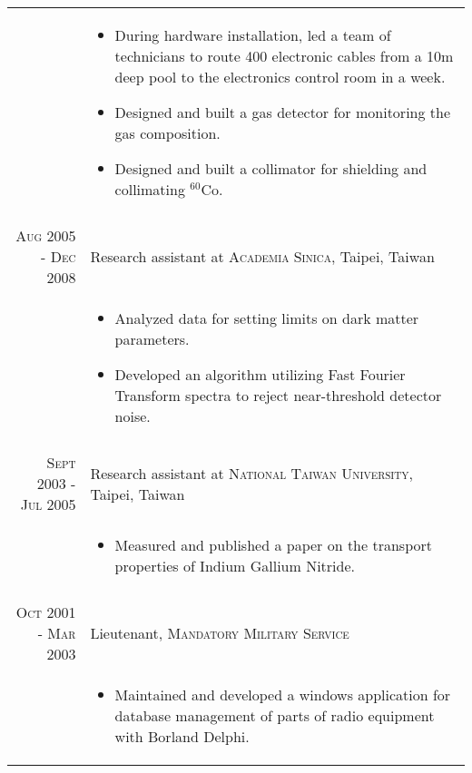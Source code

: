 \documentclass[11pt]{article} %
\begin{document}
\begin{tabular}{r|p{12cm}}
& \small
\begin{itemize}
  \item During hardware installation, led a team of technicians to route 400 electronic cables from a 10m deep pool to the electronics control room in a week.
  \item Designed and built a gas detector for monitoring the gas composition.
  \item Designed and built a collimator for shielding and collimating $^{60}$Co.
\end{itemize}\\
\multicolumn{2}{c}{} \\


\textsc{Aug 2005 - Dec 2008} & Research assistant at \textsc{Academia Sinica}, Taipei, Taiwan \\
& \small
\begin{itemize}
  \item Analyzed data for setting limits on dark matter parameters.
  \item Developed an algorithm utilizing Fast Fourier Transform spectra to reject near-threshold detector noise.
\end{itemize}
\\
\multicolumn{2}{c}{} \\


\textsc{Sept 2003 - Jul 2005} & Research assistant at \textsc{National Taiwan University}, Taipei, Taiwan \\
& \small
\begin{itemize}
  \item Measured and published a paper on the transport properties of Indium Gallium Nitride.
\end{itemize}
\\
\multicolumn{2}{c}{} \\


\textsc{Oct 2001 - Mar 2003} & Lieutenant, \textsc{Mandatory Military Service} \\
& \small
\begin{itemize}
  \item Maintained and developed a windows application for database management of parts of radio equipment with Borland Delphi.
\end{itemize}

\end{tabular}
\end{document}
